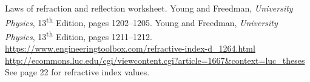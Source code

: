 \documentclass{article}
\begin{document}
\begin{thebibliography}{9}
 Laws of refraction and reflection worksheet.
 Young and Freedman, \textit{University Physics}, 13\textsuperscript{th} Edition, pages 1202--1205.
 Young and Freedman, \textit{University Physics}, 13\textsuperscript{th} Edition, pages 1211--1212.
 \url{https://www.engineeringtoolbox.com/refractive-index-d_1264.html}
 \url{http://ecommons.luc.edu/cgi/viewcontent.cgi?article=1667&context=luc_theses} See page 22 for refractive index values.
\end{thebibliography}
\end{document}
